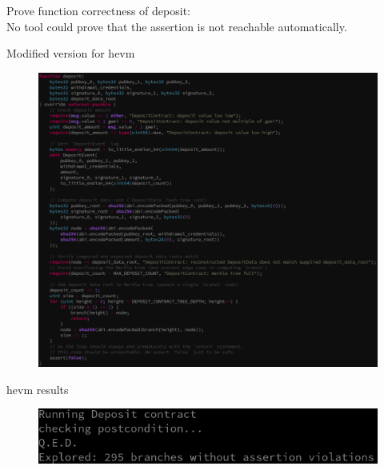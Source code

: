 \documentclass[aspectratio=169,10pt]{beamer}
\begin{document}
\begin{frame}[fragile]
\begin{center}
Prove function correctness of deposit:\\
No tool could prove that the assertion is not reachable automatically.\\
\end{center}
\end{frame}

\begin{frame}[fragile]
\begin{center}
Modified version for hevm
\begin{figure}
\includegraphics[scale=0.22]{images/deposit_hevm_code}
\end{figure}
\end{center}
\end{frame}

\begin{frame}[fragile]
\begin{center}
hevm results
\begin{figure}
	\includegraphics[scale=0.35]{images/deposit_hevm_run}
\end{figure}
\end{center}
\end{frame}
\end{document}
